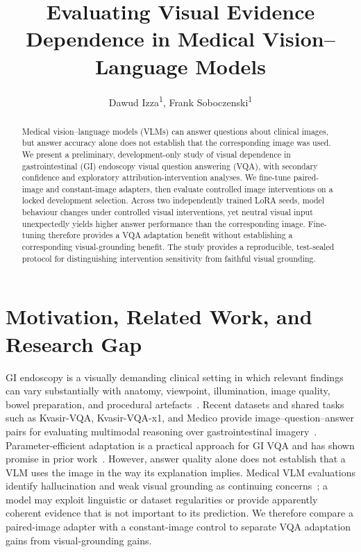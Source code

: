 \documentclass[letterpaper]{article}
\title{Evaluating Visual Evidence Dependence in Medical Vision--Language Models}
\author{
    Dawud Izza\textsuperscript{\rm 1},
    Frank Soboczenski\textsuperscript{\rm 1}
}
\begin{document}
\maketitle

\begin{abstract}
Medical vision--language models (VLMs) can answer questions about clinical images, but answer accuracy alone does not establish that the corresponding image was used. We present a preliminary, development-only study of visual dependence in gastrointestinal (GI) endoscopy visual question answering (VQA), with secondary confidence and exploratory attribution-intervention analyses. We fine-tune paired-image and constant-image adapters, then evaluate controlled image interventions on a locked development selection. Across two independently trained LoRA seeds, model behaviour changes under controlled visual interventions, yet neutral visual input unexpectedly yields higher answer performance than the corresponding image. Fine-tuning therefore provides a VQA adaptation benefit without establishing a corresponding visual-grounding benefit. The study provides a reproducible, test-sealed protocol for distinguishing intervention sensitivity from faithful visual grounding.
\end{abstract}

\section{Motivation, Related Work, and Research Gap}

GI endoscopy is a visually demanding clinical setting in which relevant findings can vary substantially with anatomy, viewpoint, illumination, image quality, bowel preparation, and procedural artefacts~\cite{beg2017quality}. Recent datasets and shared tasks such as Kvasir-VQA, Kvasir-VQA-x1, and Medico provide image--question--answer pairs for evaluating multimodal reasoning over gastrointestinal imagery~\cite{gautam2024kvasirvqa,gautam2025kvasirvqa,gautam2025medico}. Parameter-efficient adaptation is a practical approach for GI VQA and has shown promise in prior work~\cite{peter2026parameterefficient}. However, answer quality alone does not establish that a VLM uses the image in the way its explanation implies. Medical VLM evaluations identify hallucination and weak visual grounding as continuing concerns~\cite{chang2025medheval,liu2026medical}; a model may exploit linguistic or dataset regularities or provide apparently coherent evidence that is not important to its prediction. We therefore compare a paired-image adapter with a constant-image control to separate VQA adaptation gains from visual-grounding gains.
\end{document}

